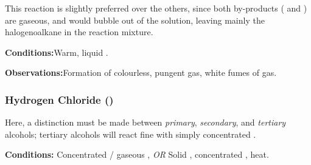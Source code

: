 				This reaction is slightly preferred over the others, since both by-products ( and ) are
				gaseous, and would bubble out of the solution, leaving mainly the halogenoalkane in the reaction mixture.

				\vspace{1.5em}
				\vbox{\textbf{Conditions:}\tabto{35mm}Warm, liquid .}

				\vspace{0.75em}
				\vbox{\textbf{Observations:}\tabto{35mm}Formation of colourless, pungent  gas,
											\tabto{35mm}white fumes of  gas.}


			\pagebreak
			\subsubsection{Hydrogen Chloride ()}

				Here, a distinction must be made between \textit{primary}, \textit{secondary}, and \textit{tertiary} alcohols;
				tertiary alcohols will react fine with simply concentrated .

				\vspace{1.5em}
				\vbox{\textbf{Conditions:}	\tabto{35mm}Concentrated  / gaseous , \textit{OR}
											\tabto{35mm}Solid , concentrated , heat.}



